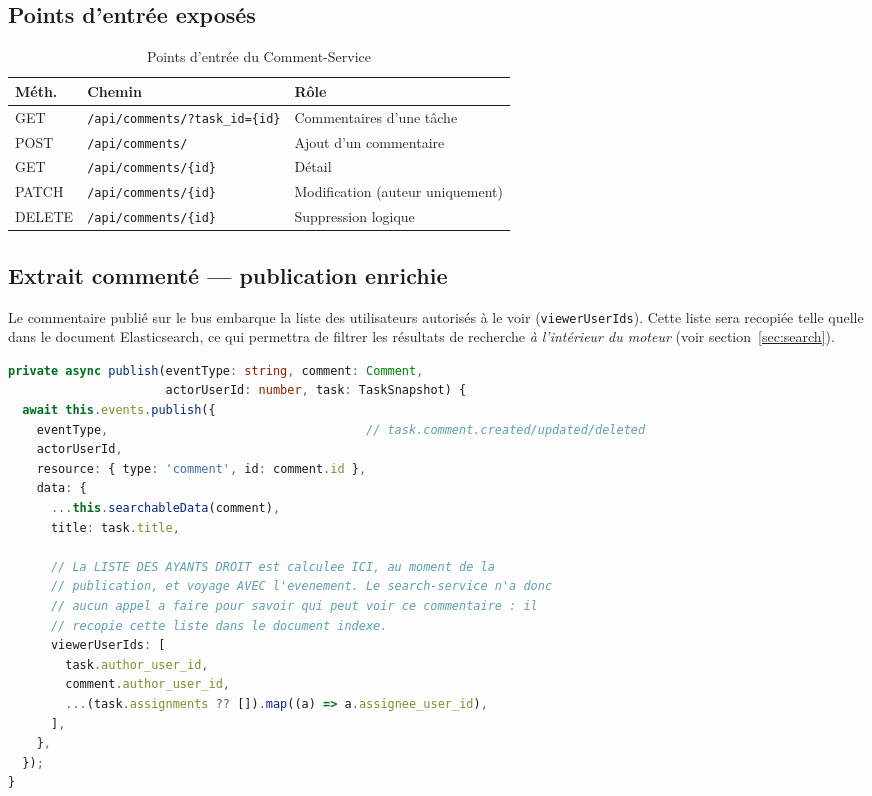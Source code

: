 \documentclass[11pt,a4paper,oneside]{report}
\newcommand{\code}[1]{\texttt{\small #1}}
\begin{document}
\subsection{Points d'entrée exposés}

\begin{table}[H]
\centering
\small
\begin{tabularx}{\linewidth}{@{}p{1.5cm}p{5.6cm}X@{}}
\toprule
\textbf{Méth.} & \textbf{Chemin} & \textbf{Rôle} \\
\midrule
GET & \code{/api/comments/?task\_id=\{id\}} & Commentaires d'une tâche \\
POST & \code{/api/comments/} & Ajout d'un commentaire \\
GET & \code{/api/comments/\{id\}} & Détail \\
PATCH & \code{/api/comments/\{id\}} & Modification (auteur uniquement) \\
DELETE & \code{/api/comments/\{id\}} & Suppression logique \\
\bottomrule
\end{tabularx}
\caption{Points d'entrée du Comment-Service}
\end{table}

\subsection{Extrait commenté — publication enrichie}

Le commentaire publié sur le bus embarque la liste des utilisateurs autorisés à
le voir (\code{viewerUserIds}). Cette liste sera recopiée telle quelle dans le
document Elasticsearch, ce qui permettra de filtrer les résultats de recherche
\emph{à l'intérieur du moteur} (voir section~\ref{sec:search}).

\begin{lstlisting}[language=TypeScript, caption={\code{src/comments/comments.service.ts} — enrichissement de l'événement}]
private async publish(eventType: string, comment: Comment,
                      actorUserId: number, task: TaskSnapshot) {
  await this.events.publish({
    eventType,                                    // task.comment.created/updated/deleted
    actorUserId,
    resource: { type: 'comment', id: comment.id },
    data: {
      ...this.searchableData(comment),
      title: task.title,

      // La LISTE DES AYANTS DROIT est calculee ICI, au moment de la
      // publication, et voyage AVEC l'evenement. Le search-service n'a donc
      // aucun appel a faire pour savoir qui peut voir ce commentaire : il
      // recopie cette liste dans le document indexe.
      viewerUserIds: [
        task.author_user_id,
        comment.author_user_id,
        ...(task.assignments ?? []).map((a) => a.assignee_user_id),
      ],
    },
  });
}
\end{lstlisting}
\end{document}
